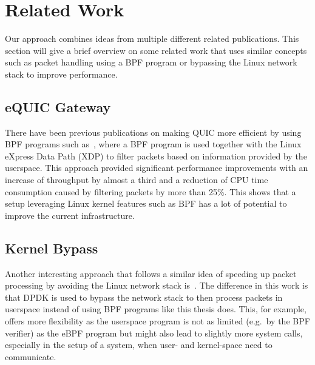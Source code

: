 \section{Related Work}\label{sec:related_work}

Our approach combines ideas from multiple different 
related publications.
This section will give a brief overview on some related work 
that uses similar concepts such as packet handling using a BPF 
program or bypassing the Linux network stack to improve performance.

\subsection{eQUIC Gateway}
There have been previous publications on making QUIC more efficient by using BPF programs
such as~\parencite{equic-gateway}, where a BPF program is used together with the Linux
eXpress Data Path (XDP) to filter packets based on information provided by the userspace.
This approach provided significant performance improvements with an increase of throughput
by almost a third and a reduction of CPU time consumption caused by filtering packets by
more than 25\%.
This shows that a setup leveraging Linux kernel features such as BPF has a lot of potential
to improve the current infrastructure.

\subsection{Kernel Bypass}
Another interesting approach that follows a similar idea of speeding up packet processing
by avoiding the Linux network stack is~\parencite{kernel-bypass-msc-thesis}.
The difference in this work is that DPDK is used to bypass the network stack to 
then process packets in userspace instead of using BPF programs like this thesis does.
This, for example, offers more flexibility as the userspace program is not as limited (e.g.\ 
by the BPF verifier) as the eBPF program but might also lead to slightly more system calls,
especially in the setup of a system, when user- and kernel-space need to communicate.

